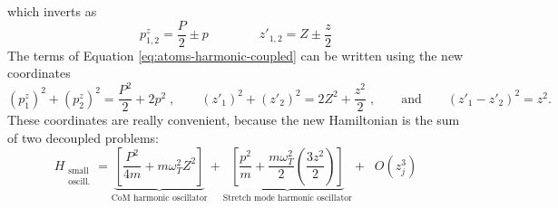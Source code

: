 which inverts as
\begin{equation*}
\label{eq:inverted-coords-coupled}
p_{1,2}^z = \frac{P}{2}\pm p \qquad \qquad z'_{1,2} = Z\pm\frac{z}{2}
\end{equation*}
The terms of Equation \ref{eq:atoms-harmonic-coupled} can be written using the new coordinates
\begin{equation*}
(p_{1}^z)^2 + (p_{2}^z)^2 = \frac{P^2}{2} + 2p^2 \;,
\qquad 
(z'_1)^2 + (z'_2)^2 = 2Z^2 + \frac{z^2}{2} \;,
\qquad \text{and} \qquad
(z'_1 - z'_2)^2 = z^2.
\end{equation*}
These coordinates are really convenient, because the new Hamiltonian is the sum of two decoupled problems:
\begin{equation}
\label{eq:twoatoms-harmonic-modes}
H_{\substack{\text{small} \\ \text{oscill.}}} = 
\underbrace{\left[ \frac{P^2}{4m}+m\omega_T^2Z^2 \right]}
_{\text{CoM harmonic oscillator}}
+ 
\underbrace{\left[\frac{p^2}{m}+\frac{m\omega_T^2}{2}\left(\frac{3z^2}{2}\right)\right]}
_{\text{Stretch mode harmonic oscillator}}
+ \;\;{O}\left( z_j^3 \right)
\end{equation}


\def\bulletrightarrow{\hbox{$\bullet$}\kern-2pt\hbox{$\rightarrow$}}
\def\bulletleftarrow{\hbox{$\leftarrow$}\kern-2pt\hbox{$\bullet$}}


